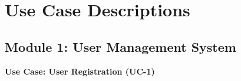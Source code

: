 \section{Use Case Descriptions}

\subsection*{Module 1: User Management System}
\label{module:minipage:user_management}

\begin{minipage}{\textwidth}
\begin{center}
    \textbf{Use Case: User Registration (UC-1)}
\end{center}
\vspace{0.5ex}
\small


\end{minipage}
